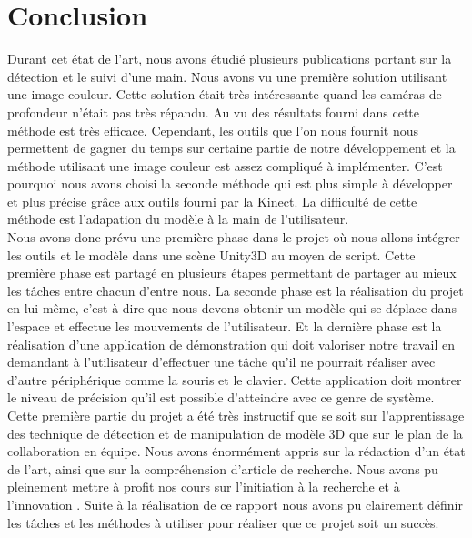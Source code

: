 \chapter*{Conclusion}
Durant cet état de l'art, nous avons étudié plusieurs publications portant sur la détection et le suivi
d'une main. Nous avons vu une première solution utilisant une image couleur. Cette solution était très
intéressante quand les caméras de profondeur n'était pas très répandu. Au vu des résultats fourni dans
\cite{haarlike} cette méthode est très efficace. Cependant, les outils que l'on nous fournit nous permettent
de gagner du temps sur certaine partie de notre développement et la méthode utilisant une image couleur
est assez compliqué à implémenter. C'est pourquoi nous avons choisi la seconde méthode qui est plus
simple à développer et plus précise grâce aux outils fourni par la Kinect. La difficulté de cette méthode
est l'adapation du modèle à la main de l'utilisateur.\\

Nous avons donc prévu une première phase dans le projet où nous allons intégrer les outils et le modèle
dans une scène Unity3D au moyen de script. Cette première phase est partagé en plusieurs étapes permettant
de partager au mieux les tâches entre chacun d'entre nous. La seconde phase est la réalisation du projet en lui-même, c'est-à-dire 
que nous devons obtenir un modèle qui se déplace dans l'espace et effectue les mouvements de l'utilisateur.
Et la dernière phase est la réalisation d'une application de démonstration qui doit valoriser notre travail
en demandant à l'utilisateur d'effectuer une tâche qu'il ne pourrait réaliser avec d'autre périphérique comme
la souris et le clavier. Cette application doit montrer le niveau de précision qu'il est possible d'atteindre
avec ce genre de système.\\

Cette première partie du projet a été très instructif que se soit sur l'apprentissage des technique de détection et de manipulation
de modèle 3D que sur le plan de la collaboration en équipe. Nous avons énormément appris sur la rédaction d'un
état de l'art, ainsi que sur la compréhension d'article de recherche. Nous avons pu pleinement mettre à profit
nos cours sur \og l'initiation à la recherche et à l'innovation \fg. Suite à la réalisation de ce rapport nous avons pu
clairement définir les tâches et les méthodes à utiliser pour réaliser que ce projet soit un succès. 
